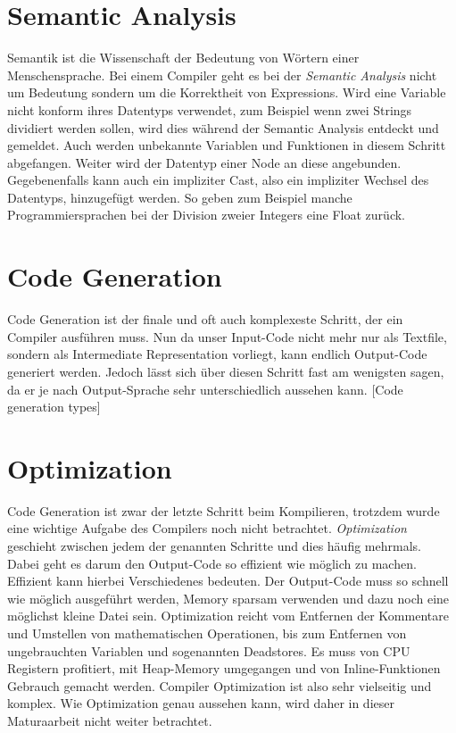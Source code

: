 \section{Semantic Analysis}
Semantik ist die Wissenschaft der Bedeutung von Wörtern einer Menschensprache. Bei einem Compiler geht es bei der \textit{Semantic Analysis} nicht um Bedeutung sondern um die Korrektheit von Expressions.
Wird eine Variable nicht konform ihres Datentyps verwendet, zum Beispiel wenn zwei Strings dividiert werden sollen, wird dies während der Semantic Analysis entdeckt und gemeldet.
Auch werden unbekannte Variablen und Funktionen in diesem Schritt abgefangen.
Weiter wird der Datentyp einer Node an diese angebunden. Gegebenenfalls kann auch ein impliziter Cast, also ein impliziter Wechsel des Datentyps, hinzugefügt werden.
So geben zum Beispiel manche Programmiersprachen bei der Division zweier Integers eine Float zurück.

\section{Code Generation}
Code Generation ist der finale und oft auch komplexeste Schritt, der ein Compiler ausführen muss. Nun da unser Input-Code nicht mehr nur als Textfile, sondern als Intermediate Representation vorliegt,
kann endlich Output-Code generiert werden. Jedoch lässt sich über diesen Schritt fast am wenigsten sagen, da er je nach Output-Sprache sehr unterschiedlich aussehen kann. 
[Code generation types]

\section{Optimization}
Code Generation ist zwar der letzte Schritt beim Kompilieren, trotzdem wurde eine wichtige Aufgabe des Compilers noch nicht betrachtet. \textit{Optimization} geschieht zwischen jedem der genannten Schritte und dies häufig mehrmals.
Dabei geht es darum den Output-Code so effizient wie möglich zu machen. Effizient kann hierbei Verschiedenes bedeuten. Der Output-Code muss so schnell wie möglich ausgeführt werden,
Memory sparsam verwenden und dazu noch eine möglichst kleine Datei sein. Optimization reicht vom Entfernen der Kommentare und Umstellen von mathematischen Operationen, bis zum Entfernen von ungebrauchten Variablen und sogenannten Deadstores.
Es muss von CPU Registern profitiert, mit Heap-Memory umgegangen und von Inline-Funktionen Gebrauch gemacht werden. Compiler Optimization ist also sehr vielseitig und komplex.
Wie Optimization genau aussehen kann, wird daher in dieser Maturaarbeit nicht weiter betrachtet.